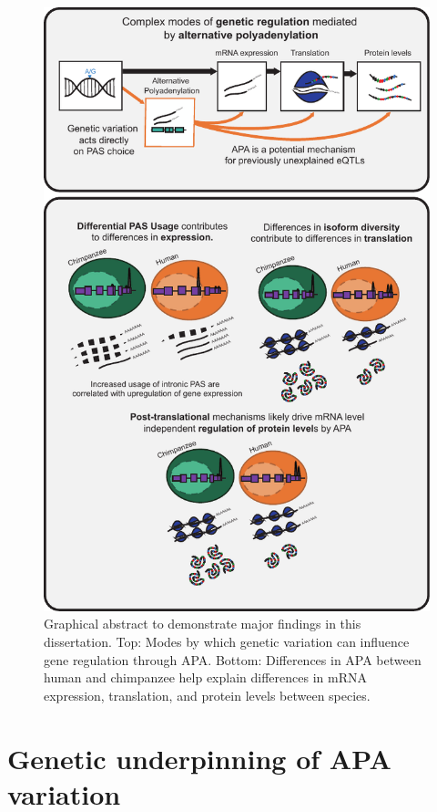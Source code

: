 \begin{figure}
\centering
\includegraphics[width=5in]{img/ch05/thesisgraphicalabstract.pdf}
\caption[Graphical Abstract of dissertation]{Graphical abstract to demonstrate major findings in this dissertation. Top: Modes by which genetic variation can influence gene regulation through APA. Bottom: Differences in APA between human and chimpanzee help explain differences in mRNA expression, translation, and protein levels between species. } 
\label{fig:abstract}
\end{figure}

 
 
\section{Genetic underpinning of APA variation}

